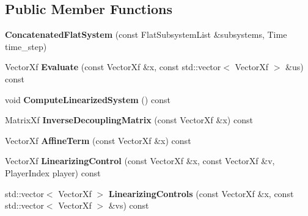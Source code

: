 \subsection*{Public Member Functions}
\begin{DoxyCompactItemize}
\item 
{\bfseries Concatenated\+Flat\+System} (const Flat\+Subsystem\+List \&subsystems, Time time\+\_\+step)\hypertarget{classilqgames_1_1_concatenated_flat_system_a705aa5fb8097f249181b645db9d59719}{}\label{classilqgames_1_1_concatenated_flat_system_a705aa5fb8097f249181b645db9d59719}

\item 
Vector\+Xf {\bfseries Evaluate} (const Vector\+Xf \&x, const std\+::vector$<$ Vector\+Xf $>$ \&us) const \hypertarget{classilqgames_1_1_concatenated_flat_system_aa66c46c672ba365b02abb639feff4320}{}\label{classilqgames_1_1_concatenated_flat_system_aa66c46c672ba365b02abb639feff4320}

\item 
void {\bfseries Compute\+Linearized\+System} () const \hypertarget{classilqgames_1_1_concatenated_flat_system_a61ec103cf78e138c7c91b98af0d922ee}{}\label{classilqgames_1_1_concatenated_flat_system_a61ec103cf78e138c7c91b98af0d922ee}

\item 
Matrix\+Xf {\bfseries Inverse\+Decoupling\+Matrix} (const Vector\+Xf \&x) const \hypertarget{classilqgames_1_1_concatenated_flat_system_a1ddfbabea2c6a2f58d013ee4d919cb31}{}\label{classilqgames_1_1_concatenated_flat_system_a1ddfbabea2c6a2f58d013ee4d919cb31}

\item 
Vector\+Xf {\bfseries Affine\+Term} (const Vector\+Xf \&x) const \hypertarget{classilqgames_1_1_concatenated_flat_system_a4cd24cf9e78380c9752bfd398dd524c3}{}\label{classilqgames_1_1_concatenated_flat_system_a4cd24cf9e78380c9752bfd398dd524c3}

\item 
Vector\+Xf {\bfseries Linearizing\+Control} (const Vector\+Xf \&x, const Vector\+Xf \&v, Player\+Index player) const \hypertarget{classilqgames_1_1_concatenated_flat_system_a396cef9dc50fb39896f917b33681310a}{}\label{classilqgames_1_1_concatenated_flat_system_a396cef9dc50fb39896f917b33681310a}

\item 
std\+::vector$<$ Vector\+Xf $>$ {\bfseries Linearizing\+Controls} (const Vector\+Xf \&x, const std\+::vector$<$ Vector\+Xf $>$ \&vs) const \hypertarget{classilqgames_1_1_concatenated_flat_system_a1bd90fe0f1198f7934d478f0c17db1d4}{}\label{classilqgames_1_1_concatenated_flat_system_a1bd90fe0f1198f7934d478f0c17db1d4}


\end{DoxyCompactItemize}
